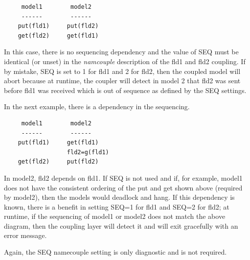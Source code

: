 \begin{verbatim}
     model1        model2
     ------        ------
    put(fld1)     put(fld2)
    get(fld2)     get(fld1)
\end{verbatim}

In this
case, there is no sequencing dependency and the value of SEQ must be
identical (or unset) in the {\it namcouple} description of the fld1
and fld2 coupling.  If by mistake, SEQ is set to 1 for fld1 and 2 for fld2, 
then the coupled model will abort because at runtime, the coupler will
detect in model 2 that fld2 was sent before fld1 was received which
is out of sequence as defined by the SEQ settings.

In the next example, there is a dependency in the sequencing.

\begin{verbatim}
     model1        model2
     ------        ------
    put(fld1)     get(fld1)
                  fld2=g(fld1)
    get(fld2)     put(fld2)
\end{verbatim}

In model2, fld2 depends on fld1. If SEQ is not used and if, for example, model1 does not have the
consistent ordering of the put and get shown above (required by model2), then the models would deadlock and hang. If this dependency is known, there is a benefit in setting SEQ=1 for fld1 and SEQ=2 for fld2; at
runtime, if the sequencing of model1 or model2 does not match the
above diagram, then the  coupling layer will detect it and will exit gracefully with an error message.

Again, the SEQ namecouple setting is only diagnostic and is not
required.



